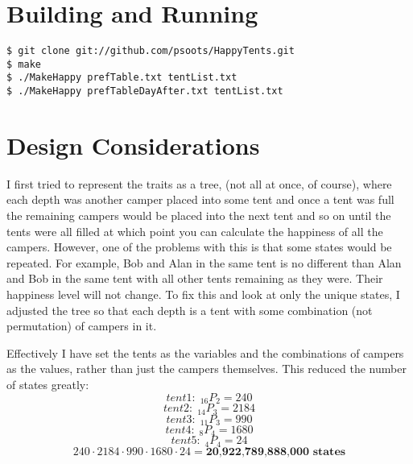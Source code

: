 \documentclass{article}
\begin{document}
\section{Building and Running}
\texttt{\$ git clone git://github.com/psoots/HappyTents.git \\
\$ make \\
\$ ./MakeHappy prefTable.txt tentList.txt \\
\$ ./MakeHappy prefTableDayAfter.txt tentList.txt} 

\section{Design Considerations}

I first tried to represent the traits as a tree, (not all at once, of course), where each depth was another camper placed into some tent and once a tent was full the remaining campers would be placed into the next tent and so on until the tents were all filled at which point you can calculate the happiness of all the campers. However, one of the problems with this is that some states would be repeated. For example, Bob and Alan in the same tent is no different than Alan and Bob in the same tent with all other tents remaining as they were. Their happiness level will not change. To fix this and look at only the unique states, I adjusted the tree so that each depth is a tent with some combination (not permutation) of campers in it. 

Effectively I have set the tents as the variables and the combinations of campers as the values, rather than just the campers themselves. This reduced the number of states greatly: 
\begin{displaymath} tent 1:\; _{16}P_{2} = 240 \end{displaymath}
\begin{displaymath} tent 2:\; _{14}P_{3} = 2184 \end{displaymath}
\begin{displaymath} tent 3:\; _{11}P_{3} = 990 \end{displaymath}
\begin{displaymath} tent 4:\; _{8}P_{4} = 1680 \end{displaymath}
\begin{displaymath} tent 5:\; _{4}P_{4} = 24 \end{displaymath}
\begin{displaymath} 240 \cdot 2184\cdot 990\cdot 1680\cdot 24 = \textbf{20,922,789,888,000 states} \end{displaymath}
\end{document}
